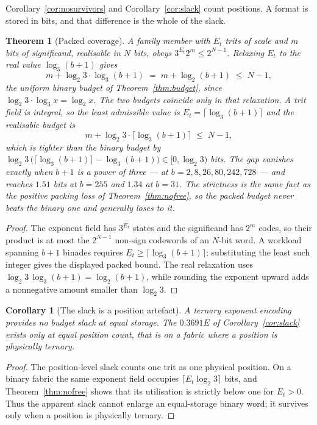 \documentclass[11pt]{article}
\newtheorem{theorem}{Theorem}
\newtheorem{corollary}{Corollary}
\theoremstyle{definition}
\begin{document}
\label{sec:packedfrontier}

Corollary~\ref{cor:nosurvivors} and Corollary~\ref{cor:slack} count positions.
A format is stored in bits, and that difference is the whole of the slack.

\begin{theorem}[Packed coverage]
\label{thm:packedcov}
A family member with $E_t$ trits of scale and $m$ bits of significand, realisable
in $N$ bits, obeys $3^{E_t}2^{m} \le 2^{N-1}$. Relaxing $E_t$ to the real value
$\log_3(b+1)$ gives
\[
  m + \log_2 3 \cdot \log_3(b+1) \;=\; m + \log_2(b+1) \;\le\; N-1 ,
\]
the uniform binary budget of Theorem~\ref{thm:budget}, since
$\log_2 3 \cdot \log_3 x = \log_2 x$. The two budgets coincide only in that
relaxation. A trit field is integral, so the least admissible value is
$E_t = \lceil\log_3(b+1)\rceil$ and the realisable budget is
\[
  m + \log_2 3 \cdot \bigl\lceil \log_3(b+1) \bigr\rceil \;\le\; N-1 ,
\]
which is tighter than the binary budget by
$\log_2 3\,\bigl(\lceil\log_3(b+1)\rceil - \log_3(b+1)\bigr) \in [0, \log_2 3)$
bits. The gap vanishes exactly when $b+1$ is a power of three --- at
$b = 2, 8, 26, 80, 242, 728$ --- and reaches $1.51$ bits at $b = 255$ and $1.34$
at $b = 31$. The strictness is the same fact as the positive packing loss of
Theorem~\ref{thm:nofree}, so the packed budget never beats the binary one and
generally loses to it.
\end{theorem}
\begin{proof}
The exponent field has $3^{E_t}$ states and the significand has $2^m$ codes,
so their product is at most the $2^{N-1}$ non-sign codewords of an $N$-bit
word.  A workload spanning $b+1$ binades requires
$E_t\geq\lceil\log_3(b+1)\rceil$; substituting the least such integer gives
the displayed packed bound.  The real relaxation uses
$\log_2 3\,\log_3(b+1)=\log_2(b+1)$, while rounding the exponent upward
adds a nonnegative amount smaller than $\log_2 3$.
\end{proof}

\begin{corollary}[The slack is a position artefact]
\label{cor:slackartefact}
A ternary exponent encoding provides no budget slack at equal storage. The
$0.3691E$ of Corollary~\ref{cor:slack} exists only at equal \emph{position}
count, that is on a fabric where a position is physically ternary.
\end{corollary}
\begin{proof}
The position-level slack counts one trit as one physical position.  On a binary
fabric the same exponent field occupies $\lceil E_t\log_2 3\rceil$ bits, and
Theorem~\ref{thm:nofree} shows that its utilisation is strictly below one for
$E_t>0$.  Thus the apparent slack cannot enlarge an equal-storage binary word;
it survives only when a position is physically ternary.
\end{proof}
\end{document}
